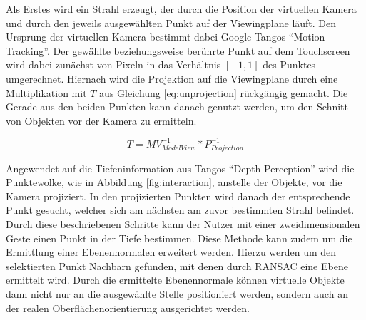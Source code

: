 Als Erstes wird ein Strahl erzeugt, der durch die Position der virtuellen Kamera und durch den jeweils ausgewählten Punkt auf der Viewingplane läuft. Den Ursprung der virtuellen Kamera bestimmt dabei Google Tangos \enquote{Motion Tracking}. Der gewählte beziehungsweise berührte Punkt auf dem Touchscreen wird dabei zunächst von Pixeln in das Verhältnis \(\left[-1,1\right]\) des Punktes umgerechnet. Hiernach wird die Projektion auf die Viewingplane durch eine Multiplikation mit \(T\) aus Gleichung \ref{eq:unprojection} rückgängig gemacht. Die Gerade aus den beiden Punkten kann danach genutzt werden, um den Schnitt von Objekten vor der Kamera zu ermitteln. \citep{OpenG86:online} 

\begin{equation} \label{eq:unprojection}
T  = MV_{ModelView}^{-1} * P_{Projection}^{-1}
\end{equation}

Angewendet auf die Tiefeninformation aus Tangos \enquote{Depth Perception} wird die Punktewolke, wie in Abbildung \ref{fig:interaction}, anstelle der Objekte, vor die Kamera projiziert. In den projizierten Punkten wird danach der entsprechende Punkt gesucht, welcher sich am nächsten am zuvor bestimmten Strahl befindet. Durch diese beschriebenen Schritte kann der Nutzer mit einer zweidimensionalen Geste einen Punkt in der Tiefe bestimmen. Diese Methode kann zudem um die Ermittlung einer Ebenennormalen erweitert werden. Hierzu werden um den selektierten Punkt Nachbarn gefunden, mit denen durch RANSAC eine Ebene ermittelt wird. Durch die ermittelte Ebenennormale können virtuelle Objekte dann nicht nur an die ausgewählte Stelle positioniert werden, sondern auch an der realen Oberflächenorientierung ausgerichtet werden.

